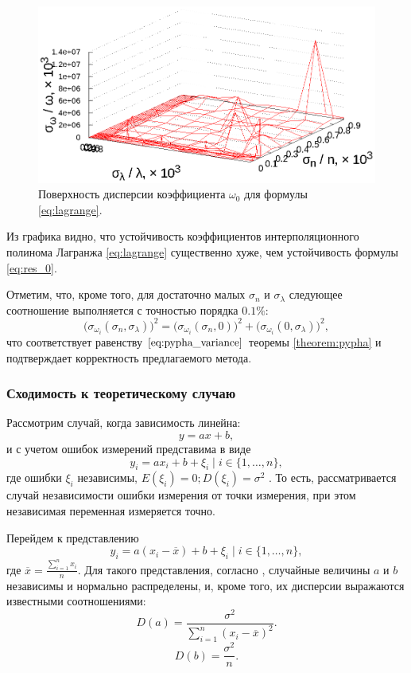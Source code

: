 \documentclass[12pt,a4paper]{article}
\begin{document}
\begin{figure}[h]
  \centering
  \includegraphics[scale=1.2]{figs/lagrange/p1.txt_coeff0.dat.eps}
  \caption{Поверхность дисперсии коэффициента $\omega_0$ для формулы \eqref{eq:lagrange}.}
  \label{fig:lagrange_i_0}
\end{figure}

Из графика видно, что устойчивость коэффициентов интерполяционного
полинома Лагранжа \eqref{eq:lagrange} существенно хуже, чем устойчивость
формулы \eqref{eq:res_0}.

Отметим, что, кроме того, для достаточно малых $\sigma_n$ и $\sigma_\lambda$
следующее соотношение выполняется с точностью порядка $0.1\%$:
\[
  \big(\sigma_{\omega_i}(\sigma_n, \sigma_{\lambda})\big)^2 =
  	\big(\sigma_{\omega_i}(\sigma_n, 0)\big)^2 +
  	  \big(\sigma_{\omega_i}(0, \sigma_{\lambda})\big)^2,
\]
что соответствует равенству $\eqref{eq:pypha_variance}$ теоремы \ref{theorem:pypha}
и подтверждает корректность предлагаемого метода.

\subsubsection{Сходимость к теоретическому случаю}

Рассмотрим случай, когда зависимость линейна:
\[
  y = ax + b,
\]
и с учетом ошибок измерений представима в виде
\[
  y_i = ax_i + b + \xi_i \mid i \in \{ 1, \dots, n \},
\]
где ошибки $\xi_i$ независимы, $E(\xi_i) = 0; D(\xi_i) = \sigma^2$ \cite{Vatunin05}.
То есть, рассматривается случай независимости ошибки измерения от точки измерения,
при этом независимая переменная измеряется точно.

Перейдем к представлению
\[
  y_i = a(x_i - \overline{x}) + b + \xi_i \mid i \in \{ 1, \dots, n \},
\]
где $\overline{x} = \frac{\sum_{i = 1}^n x_i}{n}$. Для такого представления,
согласно \cite{Vatunin05}, случайные величины $a$ и $b$ независимы
и нормально распределены, и, кроме того, их дисперсии выражаются известными соотношениями:
\begin{equation}
  \label{eq:classic_da}
  D(a) = \frac{\sigma^2}{\sum_{i = 1}^n (x_i - \overline{x})^2}.
\end{equation}
\begin{equation}
  \label{eq:classic_db}
  D(b) = \frac{\sigma^2}{n}.
\end{equation}
\end{document}
